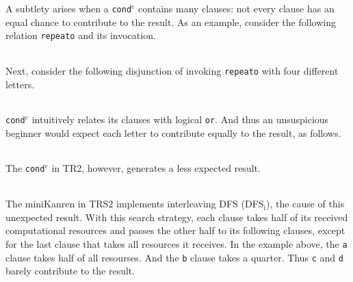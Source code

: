 \documentclass[format=acmlarge, review=true, authordraft=true]{acmart}
\newcommand{\conde}{\texttt{cond$^e$}}
\newcommand{\clisting}[1]{
\begin{center}
  \begin{tabular}{c}
	
    \end{tabular}
\end{center}
}
\newcommand{\DFSi }[0]{DFS$_\textrm{i}$}
\begin{document}




A subtlety arises 
when a \conde{} contains many clauses: not every clause has an 
equal chance to contribute to the result. As an example, consider the following 
relation \texttt{repeato} and its invocation. 

\clisting{Figures/repeato.rkt}

Next, consider the following disjunction of invoking \texttt{repeato} with four 
different letters.

\clisting{Figures/example.rkt}

\conde{} intuitively relates its clauses with logical \texttt{or}. And thus an 
unsuspicious beginner would expect each letter to contribute equally to the 
result, as follows.

\clisting{Figures/run-repeato-fair.rkt}

The \conde{} in TR2, however, generates a less expected result.

\clisting{Figures/run-repeato-idfs.rkt}

The miniKanren in TRS2 implements interleaving DFS (\DFSi), the cause of this 
unexpected result. With this search strategy, each clause takes half 
of its received computational resources and passes the other half to its 
following clauses, except for the last clause that takes all resources it 
receives. In the example above, the \texttt{a} clause takes half of all 
resourses. And the \texttt{b} clause takes a quarter. Thus \texttt{c} and 
\texttt{d} barely contribute to the result.

\end{document}

